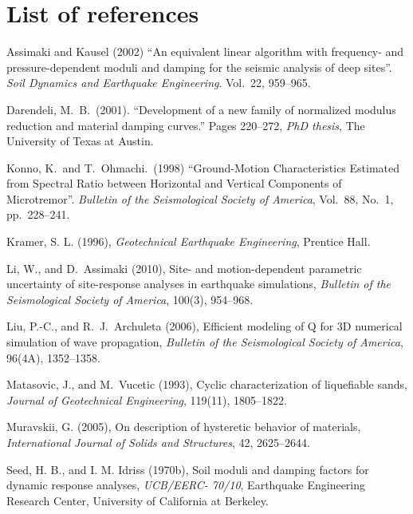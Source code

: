 \documentclass[11pt,letterpaper]{article}
\begin{document}
\section{List of references}


Assimaki and Kausel (2002) ``An equivalent linear algorithm with frequency- and pressure-dependent moduli and damping for the seismic analysis of deep sites''. \emph{Soil Dynamics and Earthquake Engineering}. Vol.~22, 959--965.

Darendeli, M.~B.~(2001). ``Development of a new family of normalized modulus reduction and material damping curves.'' Pages 220--272, \emph{PhD thesis}, The University of Texas at Austin.

Konno, K.~and T.~Ohmachi.~(1998) ``Ground-Motion Characteristics Estimated from Spectral Ratio between Horizontal and Vertical Components of Microtremor''. \emph{Bulletin of the Seismological Society of America}, Vol.~88, No.~1, pp.~228--241.

Kramer, S. L. (1996), \emph{Geotechnical Earthquake Engineering}, Prentice Hall.

Li, W., and D.~Assimaki (2010), Site- and motion-dependent parametric uncertainty of site-response analyses in earthquake simulations, \emph{Bulletin of the Seismological Society of America}, 100(3), 954--968.

Liu, P.-C., and R.~J.~Archuleta (2006), Efficient modeling of Q for 3D numerical simulation of wave propagation, \emph{Bulletin of the Seismological Society of America}, 96(4A), 1352--1358.

Matasovic, J., and M.~Vucetic (1993), Cyclic characterization of liquefiable sands, \emph{Journal of Geotechnical Engineering}, 119(11), 1805--1822.

Muravskii, G. (2005), On description of hysteretic behavior of materials, \emph{International Journal of Solids and Structures}, 42, 2625--2644.

Seed, H. B., and I. M. Idriss (1970b), Soil moduli and damping factors for dynamic response analyses, \emph{UCB/EERC- 70/10}, Earthquake Engineering Research Center, University of California at Berkeley.
\end{document}
